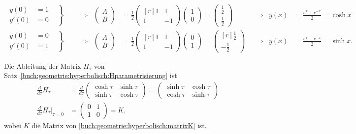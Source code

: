 \begin{align*}
\left.
\begin{aligned}
 y(0)&=1\\
y'(0)&=0
\end{aligned}
\quad\right\}
&&&\Rightarrow&
\begin{pmatrix}A\\B\end{pmatrix}
&=
\frac12
\begin{pmatrix*}[r]
1&1\\
1&-1
\end{pmatrix*}
\begin{pmatrix}1\\0\end{pmatrix}
=
\begin{pmatrix}\frac12\\\frac12\end{pmatrix}
&&\Rightarrow&
y(x)&=\frac{e^x+e^{-x}}2=\cosh x
\\
\left.
\begin{aligned}
 y(0)&=0\\
y'(0)&=1
\end{aligned}
\quad\right\}
&&&\Rightarrow&
\begin{pmatrix}A\\B\end{pmatrix}
&=
\frac12
\begin{pmatrix*}[r]
1&1\\
1&-1
\end{pmatrix*}
\begin{pmatrix}0\\1\end{pmatrix}
=
\begin{pmatrix*}[r]\frac12\\-\frac12\end{pmatrix*}
&&\Rightarrow&
y(x)&=\frac{e^x-e^{-x}}2=\sinh x.
\end{align*}

Die Ableitung der Matrix $H_{\tau}$ von 
Satz~\ref{buch:geometrie:hyperbolisch:Hparametrisierung} ist
\begin{align*}
\frac{d}{d\tau} H_{\tau}
&=
\frac{d}{d\tau}
\begin{pmatrix}
\cosh\tau & \sinh\tau\\
\sinh\tau & \cosh\tau
\end{pmatrix}
=
\begin{pmatrix}
\sinh\tau & \cosh\tau\\
\cosh\tau & \sinh\tau
\end{pmatrix}
\\
\frac{d}{d\tau} H_{\tau}
\bigg|_{\tau=0}
&=
\begin{pmatrix}
0&1\\
1&0
\end{pmatrix}
=
K,
\end{align*}
wobei $K$ die Matrix von \eqref{buch:geometrie:hyperbolisch:matrixK} ist.




